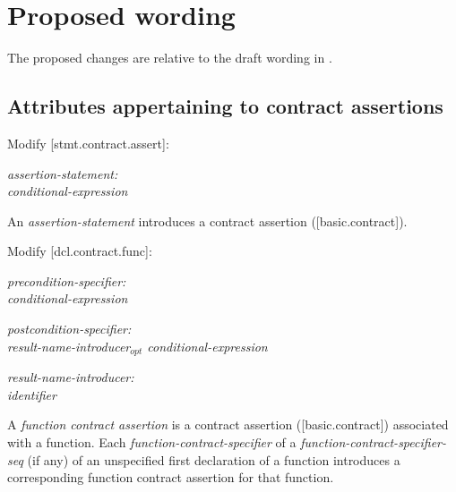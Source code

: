{%

\section{Proposed wording}

The proposed changes are relative to the draft wording in \cite{P2900R5}. 

\subsection{Attributes appertaining to contract assertions}

Modify [stmt.contract.assert]:

\begin{adjustwidth}{0.5cm}{0.5cm}
\emph{assertion-statement:} \\
\phantom{~~~}  \tcode{(} \emph{conditional-expression} \tcode{) ;}
 
An \emph{assertion-statement} introduces a contract assertion ([basic.contract]).  
\end{adjustwidth}

Modify [dcl.contract.func]:

\begin{adjustwidth}{0.5cm}{0.5cm}
\emph{precondition-specifier:} \\
\phantom{~~~}  \tcode{(} \emph{conditional-expression} \tcode{)}

\emph{postcondition-specifier:} \\
\phantom{~~~}  \tcode{(} \emph{result-name-introducer$_{opt}$ conditional-expression} \tcode{)}

\emph{result-name-introducer:} \\
\phantom{~~~}\emph{identifier} \tcode{:}

A \emph{function contract assertion} is a contract assertion ([basic.contract]) associated with a function. Each \emph{function-contract-specifier} of a \emph{function-contract-specifier-seq} (if any) of an unspecified first declaration of a function introduces a corresponding function contract assertion for that function.  
\end{adjustwidth}

}
